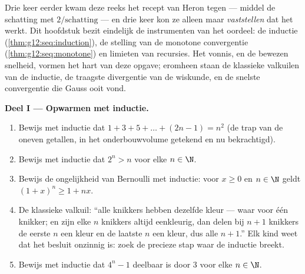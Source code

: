 \begin{problem}
\label{pb:g12:seq:1}
Drie keer eerder kwam deze reeks het recept van Heron tegen --- middel de
schatting met $2/\text{schatting}$ --- en drie keer kon ze alleen maar
\emph{vaststellen} dat het werkt. Dit hoofdstuk bezit eindelijk de
instrumenten van het oordeel: de inductie (\cref{thm:g12:seq:induction}), de
stelling van de monotone convergentie (\cref{thm:g12:seq:monotone}) en
limieten van recursies. Het vonnis, en de bewezen snelheid, vormen het hart
van deze opgave; eromheen staan de klassieke valkuilen van de inductie, de
traagste divergentie van de wiskunde, en de snelste convergentie die Gauss
ooit vond.

\medskip
\noindent\textbf{Deel I --- Opwarmen met inductie.}
\begin{enumerate}
  \item Bewijs met inductie dat $1 + 3 + 5 + \dots + (2n - 1) = n^2$ (de trap
        van de oneven getallen, in het onderbouwvolume getekend en nu
        bekrachtigd).
  \item Bewijs met inductie dat $2^n > n$ voor elke $n \in \N$.
  \item Bewijs de ongelijkheid van Bernoulli met inductie: voor $x \geq 0$ en
        $n \in \N$ geldt $(1 + x)^n \geq 1 + nx$.
  \item De klassieke valkuil: ``alle knikkers hebben dezelfde kleur --- waar
        voor één knikker; en zijn elke $n$ knikkers altijd eenkleurig, dan
        delen bij $n + 1$ knikkers de eerste $n$ een kleur en de laatste $n$
        een kleur, dus alle $n + 1$.'' Elk kind weet dat het besluit
        onzinnig is: zoek de precieze stap waar de inductie breekt.
  \item Bewijs met inductie dat $4^n - 1$ deelbaar is door $3$ voor elke
        $n \in \N$.
\end{enumerate}


\end{problem}
